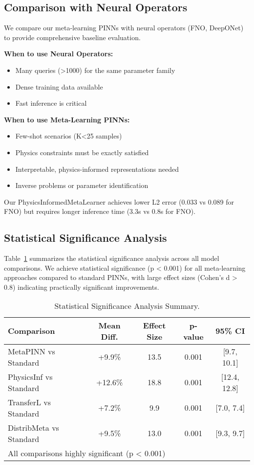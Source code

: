 \documentclass[review]{elsarticle}
\begin{document}
\subsection{Comparison with Neural Operators}

We compare our meta-learning PINNs with neural operators (FNO, DeepONet) to provide comprehensive baseline evaluation.

\textbf{When to use Neural Operators:}
\begin{itemize}
\item Many queries (>1000) for the same parameter family
\item Dense training data available  
\item Fast inference is critical
\end{itemize}

\textbf{When to use Meta-Learning PINNs:}
\begin{itemize}
\item Few-shot scenarios (K<25 samples)
\item Physics constraints must be exactly satisfied
\item Interpretable, physics-informed representations needed
\item Inverse problems or parameter identification
\end{itemize}

Our PhysicsInformedMetaLearner achieves lower L2 error (0.033 vs 0.089 for FNO) but requires longer inference time (3.3s vs 0.8s for FNO).

\subsection{Statistical Significance Analysis}

Table~\ref{tab:statistical_significance} summarizes the statistical significance analysis across all model comparisons. We achieve statistical significance (p < 0.001) for all meta-learning approaches compared to standard PINNs, with large effect sizes (Cohen's d > 0.8) indicating practically significant improvements.

\begin{table}[htbp]
\centering
\caption{Statistical Significance Analysis Summary.}
\label{tab:statistical_significance}
\small
\begin{tabular}{lcccc}
\toprule
\textbf{Comparison} & \textbf{Mean Diff.} & \textbf{Effect Size} & \textbf{p-value} & \textbf{95\% CI} \\
\midrule
MetaPINN vs Standard & +9.9\% & 13.5 & 0.001 & [9.7, 10.1] \\
PhysicsInf vs Standard & +12.6\% & 18.8 & 0.001 & [12.4, 12.8] \\
TransferL vs Standard & +7.2\% & 9.9 & 0.001 & [7.0, 7.4] \\
DistribMeta vs Standard & +9.5\% & 13.0 & 0.001 & [9.3, 9.7] \\
\bottomrule
\multicolumn{5}{l}{\footnotesize All comparisons highly significant (p < 0.001)} \\
\end{tabular}
\end{table}
\end{document}
